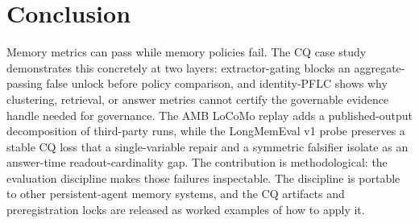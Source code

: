 \section{Conclusion}

Memory metrics can pass while memory policies fail. The CQ case study
demonstrates this concretely at two layers: extractor-gating blocks an
aggregate-passing false unlock before policy comparison, and identity-PFLC
shows why clustering, retrieval, or answer metrics cannot certify the
governable evidence handle needed for governance. The AMB LoCoMo replay adds a
published-output decomposition of third-party runs, while the LongMemEval v1
probe preserves a stable CQ loss that a single-variable repair and a symmetric
falsifier isolate as an answer-time readout-cardinality gap. The contribution
is methodological: the evaluation discipline makes those failures inspectable.
The discipline is portable to
other persistent-agent memory systems, and the CQ artifacts and preregistration
locks are released as worked examples of how to apply it.
